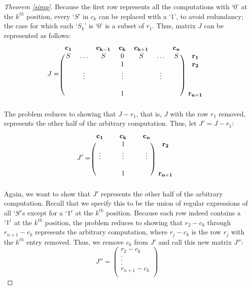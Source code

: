 \documentclass[runningheads]{llncs}
\begin{document}
\begin{proof}[Theorem \ref{simp}]
Because the first row represents all the computations with `0' at the $k^{th}$ position, every `$S$' in $c_k$ can be replaced with a `1', to avoid redundancy; the case for which each `$S_k$' is `0' is a subset of $r_1$. Thus, matrix $J$ can be represented as follows:
\[
J = \begin{blockarray}{cccccccc}
\mathbf{c_1} & & \mathbf{c_{k-1}} & \mathbf{c_k} & \mathbf{c_{k+1}} & & \mathbf{c_n} \\
\begin{block}{(ccccccc)c}
    S & \hdots & S & 0 & S & \hdots & S & \mathbf{r_1}\\
     &  &  & 1 &  &  &  & \mathbf{r_2}\\
    &  \vdots &  & \vdots &  &  \vdots &  & \\
    &  &  &  &  & &  & \\
    & & & 1 & &  & & \mathbf{r_{n+1}}\\
\end{block}
\end{blockarray}
 \]
The problem reduces to showing that $J - r_1$, that is, $J$ with the row $r_1$ removed, represents the other half of the arbitrary computation. Thus, let $J' = J - r_1$:
\[
J' = \begin{blockarray}{cccccc}
\mathbf{c_1} &  & \mathbf{c_k} & & \mathbf{c_n} \\
\begin{block}{(ccccc)c}
     &   & 1 &   &  & \mathbf{r_2}\\
     \vdots & &  \vdots & & \vdots  & \\
    &   &   & &  & \\
    & & 1 &  & & \mathbf{r_{n+1}}\\
\end{block}
\end{blockarray}
 \]
Again, we want to show that $J'$ represents the other half of the arbitrary computation. Recall that we specify this to be the union of regular expressions of all $`S'$s except for a $`1'$ at the $k^{th}$ position. Because each row indeed contains a $`1'$ at the $k^{th}$ position, the problem reduces to showing that $r_2 - c_k$ through $r_{n+1} - c_k$ represents the arbitrary computation, where $r_j - c_k$ is the row $r_j$ with the $k^{th}$ entry removed. Thus, we remove $c_k$ from $J'$ and call this new matrix $J''$:
\[
 J'' = \begin{pmatrix}
    r_2 - c_k \\
    . \\
    . \\
    . \\
    r_{n+1} - c_k \\
    

\end{pmatrix}\]
\end{proof}
\end{document}
